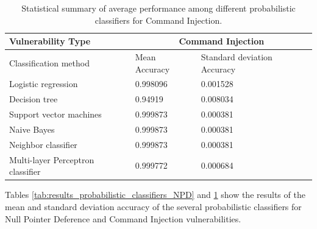 \documentclass[journal,a4paper]{IEEEtran}
\begin{document}
\begin{table}[!ht]
    \centering
    \caption{Statistical summary of average performance among different probabilistic classifiers for Command Injection.}
    \begin{tabular}{|l|l|l|}
    \hline
        \textbf{Vulnerability Type} & \multicolumn{2}{|c|}{\textbf{Command Injection}} \\ \hline
        Classification method &  Mean Accuracy & Standard deviation Accuracy \\ \hline
        Logistic regression & 0.998096 & 0.001528 \\ \hline
        Decision tree & 0.94919 & 0.008034 \\ \hline
        Support vector machines & 0.999873 & 0.000381 \\ \hline
        Naive Bayes & 0.999873 & 0.000381 \\ \hline
        Neighbor classifier & 0.999873 & 0.000381 \\ \hline
        Multi-layer Perceptron classifier & 0.999772 & 0.000684 \\ \hline
    \end{tabular}
	\label{tab:results_probabilistic_classifiers_CI}
\end{table}

Tables \ref{tab:results_probabilistic_classifiers_NPD}  and \ref{tab:results_probabilistic_classifiers_CI} show the results of the mean and standard deviation accuracy of the several probabilistic classifiers for Null Pointer Deference and Command Injection vulnerabilities.



\end{document}
